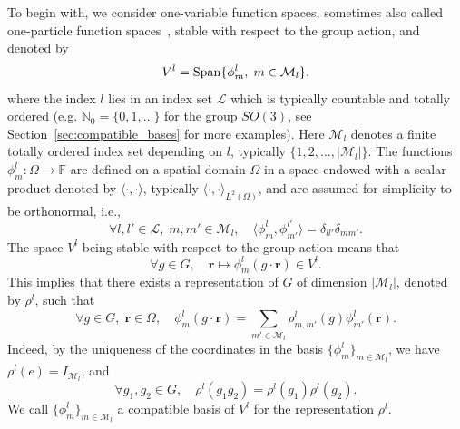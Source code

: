 \documentclass{article}
\newcommand{\rep}[2]{\rho^{#1}_{#2}}
\newcommand{\card}[1]{|{#1}|}
\numberwithin{equation}{section}
\def\N{\mathbb{N}}
\def\F{\mathbb{F}}
\def\br{{\bm r}}
\def\calM{\mathcal{M}}
\def\calL{\mathcal{L}}
\begin{document}
To begin with, we consider one-variable function spaces, sometimes also called one-particle function spaces~\cite{Dusson2022-ie,Batatia2023-us}, stable with respect to the group action, and denoted by
\[
    V^l =  {\rm Span}\{ \phi^l_m, \; m\in  \calM_l \}, 
\]
 where the index $l$ lies in an index set $\calL$ which is typically countable and totally ordered (e.g. $\N_0 = \{0,1,\ldots\}$ for the group $SO(3)$, see Section~\ref{sec:compatible_bases} for more examples). Here $\calM_l$ denotes a finite totally ordered index set depending on $l$, typically $\{ 1,2, \ldots, \card{\calM_l} \}$. The functions $\phi^l_m:\Omega \rightarrow \F$ are defined on a spatial domain $\Omega$ in a space endowed with a scalar product denoted by $\langle \cdot, \cdot \rangle$, typically $\langle \cdot, \cdot \rangle_{L^2(\Omega)}$,
and
are assumed for simplicity to be orthonormal, i.e.,
\begin{equation}
\forall l,l' \in \calL, \;
     m,m' \in \calM_l,
\quad 
\langle\phi^l_m,\phi^{l'}_{m'}\rangle
=\delta_{ll'}\delta_{mm'}.
\label{eq:orthogonality}
\end{equation}
The space $V^l$ being stable with respect to the group action means that
\[
    \forall g \in G,
    \quad \br \mapsto \phi^l_m(g \cdot \br) \in V^l.
\]
This implies that there exists a representation of $G$ of dimension $\card{\calM_l}$, denoted by $\rep{l}{}$, such that
\begin{equation}\label{eq:1b-basis}
   \forall g\in G, \;  \br \in \Omega, \quad  \phi^l_m(g \cdot \br) = \sum_{m' \in \calM_l} \rep{l}{m,m'}(g) \phi^l_{m'}(\br).
\end{equation}
Indeed, by the uniqueness of the coordinates in the basis 
$\{ \phi^l_m \}_{m\in \calM_l}$, we have
$\rep{l}{}(e) = I_{\calM_l}$, and 
\[
    \forall g_1,g_2\in G, \quad \rep{l}{}(g_1 g_2) = \rep{l}{}(g_1) \rep{l}{}(g_2).
\]
We call $\{\phi^l_m\}_{m\in\calM_l}$ a compatible basis of $V^l$ for the representation $\rep{l}{}$. 
\end{document}
